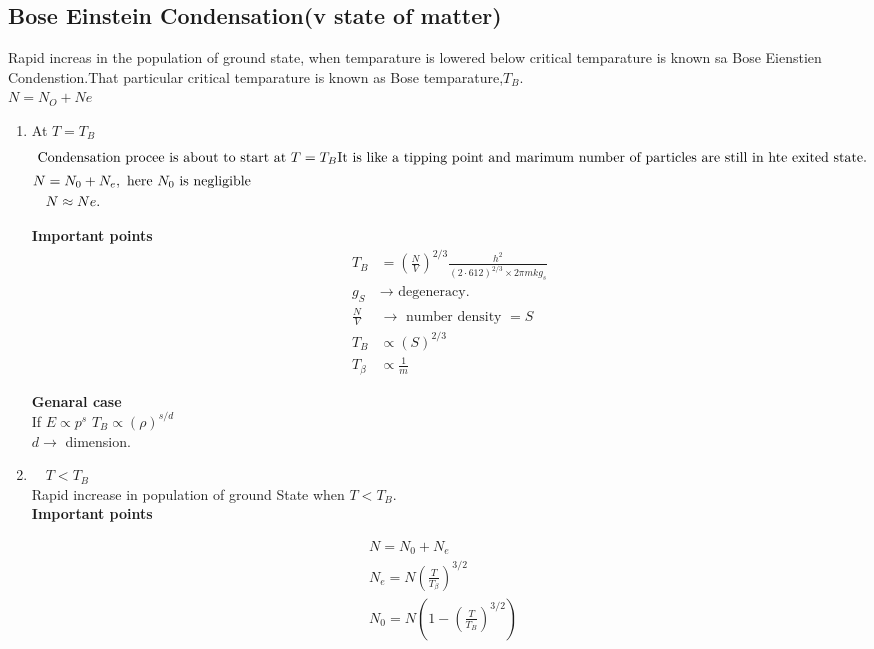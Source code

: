 \subsection{Bose Einstein Condensation(v state of matter)}
Rapid increas in the population of ground state,
when temparature is lowered below critical temparature is known sa Bose Eienstien Condenstion.That particular critical temparature is known as Bose temparature,$T_{B}.$\\
$N=N_{O}+Ne$\\
\begin{enumerate}
	\item At $T=T_{B}$\\
	\begin{align*}
	\intertext{	Condensation procee is about to start at $T=T_{B}$It is like a tipping point and marimum number of particles are still in hte exited state.}
	N&=N_{0}+N_{e},\text{ here $N_{0}$ is negligible}\\
	&N \approx N e.\\
	\end{align*}
	
	
	
	\textbf{Important points}\\
	\begin{align*}
	T_{B}&=\left(\frac{N}{V}\right)^{2 / 3} \frac{h^{2}}{(2 \cdot 612)^{2 / 3} \times 2 \pi m k g_{s}}\\
	g_{S} &\rightarrow\text{ degeneracy.}\\
	\frac{N}{V} &\rightarrow\text{ number density $=S$}\\
	T_{B} &\propto(S)^{2 / 3}\\
	T_{\beta} &\propto \frac{1}{m}
	\end{align*}
	
	
	
	\textbf{Genaral case}\\
	If $E \propto p^{s}$ $T_{B} \propto(\rho)^{s / d}$\\
	$d \rightarrow$ dimension.
	\item  $\quad T<T_{B}$\\
	Rapid increase in population of ground State when $T<T_{B}$.\\
	\textbf{Important points}\\
\end{enumerate}
\begin{align*}
&N=N_{0}+N_{e} \\
&N_{e}=N\left(\frac{T}{T_{\beta}}\right)^{3 / 2} \\
&N_{0}=N\left(1-\left(\frac{T}{T_{B}}\right)^{3 / 2}\right)
\end{align*}
